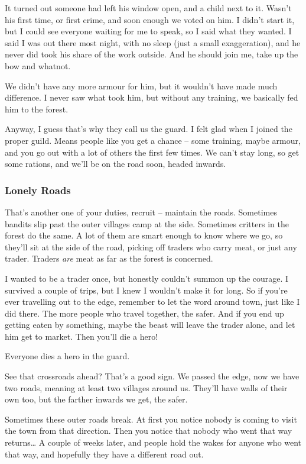 \begin{multicols}{2}
\begin{exampletext}
  It turned out someone had left his window open, and a child next to it.
  Wasn't his first time, or first crime, and soon enough we voted on him.
  I didn't start it, but I could see everyone waiting for me to speak, so I said what they wanted.
  I said I was out there most night, with no sleep (just a small exaggeration), and he never did took his share of the work outside.
  And he should join me, take up the bow and whatnot.

  We didn't have any more armour for him, but it wouldn't have made much difference.
  I never saw what took him, but without any training, we basically fed him to the forest.
  
  Anyway, I guess that's why they call us the \gls{guard}.
  I felt glad when I joined the proper guild.
  Means people like you get a chance -- some training, maybe armour, and you go out with a lot of others the first few times.
  We can't stay long, so get some rations, and we'll be on the road soon, headed inwards.

  \subsubsection*{Lonely Roads}

  That's another one of your duties, recruit -- maintain the roads.
  Sometimes bandits slip past the outer \glspl{village} camp at the side.
  Sometimes critters in the forest do the same.
  A lot of them are smart enough to know where we go, so they'll sit at the side of the road, picking off traders who carry meat, or just any trader.
  Traders \emph{are} meat as far as the forest is concerned.

  I wanted to be a trader once, but honestly couldn't summon up the courage.
  I survived a couple of trips, but I knew I wouldn't make it for long.
  So if you're ever travelling out to the \gls{edge}, remember to let the word around town, just like I did there.
  The more people who travel together, the safer.
  And if you end up getting eaten by something, maybe the beast will leave the trader alone, and let him get to market.
  Then you'll die a hero!

  Everyone dies a hero in the \gls{guard}.

  See that crossroads ahead?
  That's a good sign.
  We passed the \gls{edge}, now we have two roads, meaning at least two \glspl{village} around us.
  They'll have walls of their own too, but the farther inwards we get, the safer.

  Sometimes these outer roads break.
  At first you notice nobody is coming to visit the town from that direction.
  Then you notice that nobody who went that way returns\ldots
  A couple of weeks later, and people hold the wakes for anyone who went that way, and hopefully they have a different road out.


\end{exampletext}
\end{multicols}
